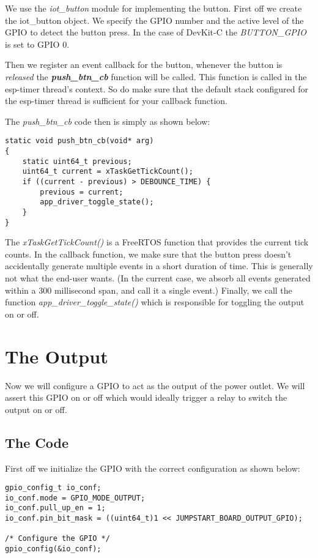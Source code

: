 \documentclass[main.tex]{subfiles}
\begin{document}
We use the \textit{iot\_button} module for implementing the button. 
First off we create the iot\_button object. We specify the GPIO number and the active level of the GPIO to detect the button press. In the case of DevKit-C the \textit{BUTTON\_GPIO} is set to GPIO 0. 

Then we register an event callback for the button, whenever the button is \textit{released} the \textit{\textbf{push\_btn\_cb}} function will be called. This function is called in the esp-timer thread's context. So do make sure that the default stack configured for the esp-timer thread is sufficient for your callback function.

The \textit{push\_btn\_cb} code then is simply as shown below:
\begin{verbatim}
static void push_btn_cb(void* arg)
{
    static uint64_t previous;
    uint64_t current = xTaskGetTickCount();
    if ((current - previous) > DEBOUNCE_TIME) {
        previous = current;
        app_driver_toggle_state();
    }
}
\end{verbatim}

The \textit{xTaskGetTickCount()} is a FreeRTOS function that provides the current tick counts. In the callback function, we make sure that the button press doesn't accidentally generate multiple events in a short duration of time. This is generally not what the end-user wants. (In the current case, we absorb all events generated within a 300 millisecond span, and call it a single event.)
Finally, we call the function \textit{app\_driver\_toggle\_state()} which is responsible for toggling the output on or off.

\section{The Output}
Now we will configure a GPIO to act as the output of the power outlet. We will assert this GPIO on or off which would ideally trigger a relay to switch the output on or off.

\subsection{The Code}\label{sec:relay}
First off we initialize the GPIO with the correct configuration as shown below:

\begin{verbatim}
gpio_config_t io_conf;
io_conf.mode = GPIO_MODE_OUTPUT;
io_conf.pull_up_en = 1;
io_conf.pin_bit_mask = ((uint64_t)1 << JUMPSTART_BOARD_OUTPUT_GPIO);

/* Configure the GPIO */
gpio_config(&io_conf);

\end{verbatim}
\end{document}
